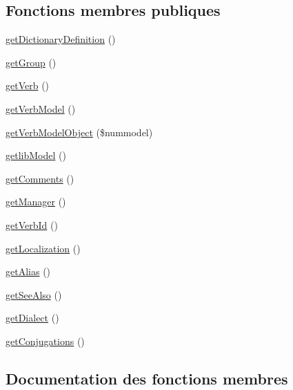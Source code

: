 \subsection*{Fonctions membres publiques}
\begin{DoxyCompactItemize}
\item 
\hyperlink{interfacei_conjugation_ab13cedc1b4f0d064a9bfff3cbfb63de6}{get\+Dictionary\+Definition} ()
\item 
\hyperlink{interfacei_conjugation_a21390064de33a77b99b26ec5a2e55351}{get\+Group} ()
\item 
\hyperlink{interfacei_conjugation_a5742a474f6114e172337a38ca2c8bae8}{get\+Verb} ()
\item 
\hyperlink{interfacei_conjugation_ab5482cc8f8e9f58dc852aff604813b6e}{get\+Verb\+Model} ()
\item 
\hyperlink{interfacei_conjugation_ab076acd6674f8effbf5306d6b92f3ad3}{get\+Verb\+Model\+Object} (\$nummodel)
\item 
\hyperlink{interfacei_conjugation_a2b6dd0a979a98bc50f6f9f7ec9b69e63}{getlib\+Model} ()
\item 
\hyperlink{interfacei_conjugation_ad887ef20e584040fe72f6e5a6212247e}{get\+Comments} ()
\item 
\hyperlink{interfacei_conjugation_a448829b47813a79d1f8ec65de91e8696}{get\+Manager} ()
\item 
\hyperlink{interfacei_conjugation_aa34e7af66125d28af4f485529d456a74}{get\+Verb\+Id} ()
\item 
\hyperlink{interfacei_conjugation_ab19ceb5ab295fd3d0f862d963379a7e2}{get\+Localization} ()
\item 
\hyperlink{interfacei_conjugation_a30a8959865d6b8d3f4ae69c31792f32a}{get\+Alias} ()
\item 
\hyperlink{interfacei_conjugation_a58e61c703ad1f0d76db1535235e530a0}{get\+See\+Also} ()
\item 
\hyperlink{interfacei_conjugation_a4e0b6c0923ecd596b6acff6c7b776f5f}{get\+Dialect} ()
\item 
\hyperlink{interfacei_conjugation_a6c0072d898eb8b2f3756c87dfed4af33}{get\+Conjugations} ()
\end{DoxyCompactItemize}


\subsection{Documentation des fonctions membres}
\hypertarget{interfacei_conjugation_a30a8959865d6b8d3f4ae69c31792f32a}{}\label{interfacei_conjugation_a30a8959865d6b8d3f4ae69c31792f32a} 
